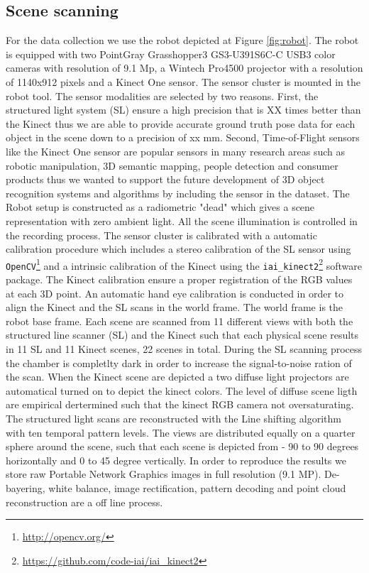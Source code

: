 \documentclass[10pt,twocolumn,letterpaper]{article}
\begin{document}
\subsection{Scene scanning} 
For the data collection we use the robot depicted at Figure \ref{fig:robot}. The robot is equipped with two PointGray Grasshopper3 GS3-U391S6C-C USB3 color cameras with resolution of 9.1 Mp, a Wintech Pro4500 projector with a resolution of 1140x912 pixels and a Kinect One sensor. The sensor cluster is mounted in the robot tool. The sensor modalities are selected by two reasons. First, the structured light system (SL) ensure a high precision that is XX times better than the Kinect thus we are able to provide accurate ground truth pose data for each object in the scene down to a precision of xx mm. Second, Time-of-Flight sensors like the Kinect One sensor are popular sensors in many research areas such as robotic manipulation, 3D semantic mapping, people detection and consumer products thus we wanted to support the future development of 3D object recognition systems and algorithms by including the sensor in the dataset. 
The Robot setup is constructed as a radiometric "dead" which gives a scene representation with zero ambient light. All the scene illumination is controlled in the recording process. The sensor cluster is calibrated with a automatic calibration procedure which includes a stereo calibration of the SL sensor using \verb|OpenCV|\footnote{\url{http://opencv.org/}} and a intrinsic calibration of the Kinect using the \verb|iai_kinect2|\footnote{\url{https://github.com/code-iai/iai_kinect2}} software package. The Kinect calibration ensure a proper registration of the RGB values at each 3D point. An automatic hand eye calibration \cite{DornaikaHoraud1998} is conducted in order to align the Kinect and the SL scans in the world frame. The world frame is the robot base frame.
Each scene are scanned from 11 different views with both the structured line scanner (SL) and the Kinect such that each physical scene results in 11 SL and 11 Kinect scenes, 22 scenes in total. During the SL scanning process the chamber is completlty dark in order to increase the signal-to-noise ration of the scan. When the Kinect scene are depicted a two diffuse light projectors are automatical turned on to depict the kinect colors. The level of diffuse scene ligth are empirical dertermined such that the kinect RGB camera not oversaturating.  The structured light scans are reconstructed with the Line shifting algorithm \cite{Guehring2000} with ten temporal pattern levels. The views are distributed equally on a quarter sphere around the scene, such that each scene is depicted from - 90 to 90 degrees horizontally and 0 to 45 degree vertically. In order to reproduce the results we store raw Portable Network Graphics images in full resolution (9.1 MP). De-bayering, white balance, image rectification, pattern decoding and point cloud reconstruction are a off line process.   
\end{document}
